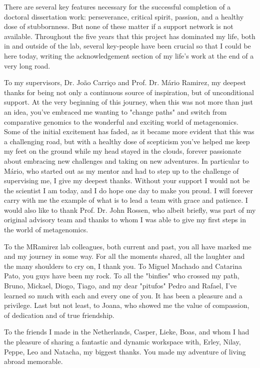 There are several key features necessary for the successful completion of a doctoral dissertation work: perseverance, critical spirit, passion, and a healthy dose of stubbornness. But none of these matter if a support network is not available. Throughout the five years that this project has dominated my life, both in and outside of the lab, several key-people have been crucial so that I could be here today, writing the acknowledgement section of my life's work at the end of a very long road. 

To my supervisors, Dr. João Carriço and Prof. Dr. Mário Ramirez, my deepest thanks for being not only a continuous source of inspiration, but of unconditional support. At the very beginning of this journey, when this was not more than just an idea, you've embraced me wanting to "change paths" and switch from comparative genomics to the wonderful and exciting world of metagenomics. Some of the initial excitement has faded, as it became more evident that this was a challenging road, but with a healthy dose of scepticism you've helped me keep my feet on the ground while my head stayed in the clouds, forever passionate about embracing new challenges and taking on new adventures. In particular to Mário, who started out as my mentor and had to step up to the challenge of supervising me, I give my deepest thanks. Without your support I would not be the scientist I am today, and I do hope one day to make you proud. I will forever carry with me the example of what is to lead a team with grace and patience. I would also like to thank Prof. Dr. John Rossen, who albeit briefly, was part of my original advisory team and thanks to whom I was able to give my first steps in the world of metagenomics. 

To the MRamirez lab colleagues, both current and past, you all have marked me and my journey in some way. For all the moments shared, all the laughter and the many shoulders to cry on, I thank you. To Miguel Machado and Catarina Pato, you guys have been my rock. To all the "binfies" who crossed my path, Bruno, Mickael, Diogo, Tiago, and my dear "pitufos" Pedro and Rafael, I've learned so much with each and every one of you. It has been a pleasure and a privilege. Last but not least, to Joana, who showed me the value of compassion, of dedication and of true friendship.

To the friends I made in the Netherlands, Casper, Lieke, Boas, and whom I had the pleasure of sharing a fantastic and dynamic workspace with, Erley, Nilay, Peppe, Leo and Natacha, my biggest thanks. You made my adventure of living abroad memorable.

